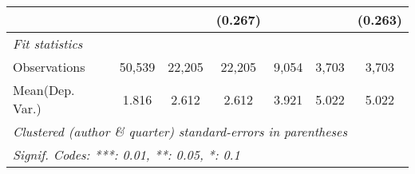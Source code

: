 \begin{tabular}{lcccccc}
                           &         &         & (0.267)      &              &         & (0.263)\\   
   \midrule
   \emph{Fit statistics}\\
   Observations            & 50,539  & 22,205  & 22,205       & 9,054        & 3,703   & 3,703\\  
Mean(Dep. Var.) & 1.816 & 2.612 & 2.612 & 3.921 & 5.022 & 5.022 \\
   \midrule \midrule
   \multicolumn{7}{l}{\emph{Clustered (author \& quarter) standard-errors in parentheses}}\\
   \multicolumn{7}{l}{\emph{Signif. Codes: ***: 0.01, **: 0.05, *: 0.1}}\\
\end{tabular}
\par\endgroup

